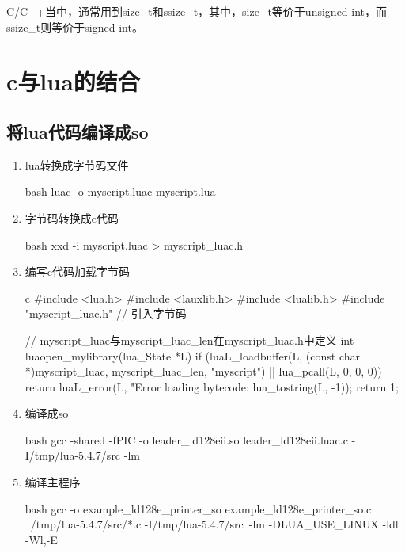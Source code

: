 C/C++当中，通常用到size\_t和ssize\_t，其中，size\_t等价于unsigned int，而
ssize\_t则等价于signed int。

\section{c与lua的结合}
\subsection{将lua代码编译成so}
\begin{enumerate}
  \item lua转换成字节码文件
\begin{code-block}{bash}
luac -o myscript.luac myscript.lua
\end{code-block}

  \item 字节码转换成c代码
\begin{code-block}{bash}
xxd -i myscript.luac > myscript_luac.h
\end{code-block}

  \item 编写c代码加载字节码
\begin{code-block}{c}
#include <lua.h>
#include <lauxlib.h>
#include <lualib.h>
#include "myscript_luac.h"  // 引入字节码

// myscript_luac与myscript_luac_len在myscript_luac.h中定义
int luaopen_mylibrary(lua_State *L) {
    if (luaL_loadbuffer(L, (const char *)myscript_luac,
        myscript_luac_len, "myscript") || lua_pcall(L, 0, 0, 0)) {
        return luaL_error(L, "Error loading bytecode: %
            lua_tostring(L, -1));
    }
    return 1;
}
\end{code-block}

  \item 编译成so
\begin{code-block}{bash}
gcc -shared -fPIC -o leader_ld128eii.so leader_ld128eii.luac.c   -I/tmp/lua-5.4.7/src  -lm
\end{code-block}

  \item 编译主程序
\begin{code-block}{bash}
gcc -o example_ld128e_printer_so example_ld128e_printer_so.c \
    /tmp/lua-5.4.7/src/*.c -I/tmp/lua-5.4.7/src\
    -lm -DLUA_USE_LINUX -ldl -Wl,-E
\end{code-block}

\end{enumerate}


